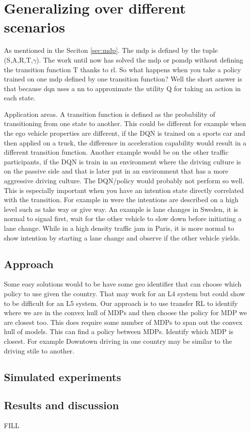 \chapter{Generalizing over different scenarios}
As mentioned in the Seciton \ref{sec:mdp}. The \gls{mdp} is defined by the tuple (S,A,R,T,$\gamma$). The work until now has solved the \gls{mdp} or \gls{pomdp} without defining the transition function T thanks to \gls{rl}. So what happens when you take a policy trained on one \gls{mdp} defined by one transition function? Well the short answer is that because \gls{dqn} uses a \gls{nn} to approximate the utility Q for taking an action in each state. 

Application areas. A transition function is defined as the probability of transitioning from one state to another. This could be different for example when the ego vehicle properties are different, if the DQN is trained on a sports car and then applied on a truck, the difference in acceleration capability would result in a different transition function. Another example would be on the other traffic participants, if the DQN is train in an environment where the driving culture is on the passive side and that is later put in an environment that has a more aggressive driving culture. The DQN/policy would probably not perform so well. 
This is especially important when you have an intention state directly correlated with the transition. For example in \paperD were the intentions are described on a high level such as take way or give way. 
An example is lane changes in Sweden, it is normal to signal first, wait for the other vehicle to slow down before initiating a lane change. While in a high density traffic jam in Paris, it is more normal to show intention by starting a lane change and observe if the other vehicle yields. 

\section{Approach}
Some easy solutions would to be have some geo identifier that can choose which policy to use given the country. That may work for an L4 system but could show to be difficult for an L5 system. Our approach is to use transfer RL to identify where we are in the convex hull of MDPs and then choose the policy for MDP we are closest too. 
This does require some number of MDPs to span out the convex hull of models. 
This can find a policy between MDPs. 
Identify which MDP is closest. For example Downtown driving in one country may be similar to the driving stile to another. 


\section{Simulated experiments}
\section{Results and discussion}
FILL